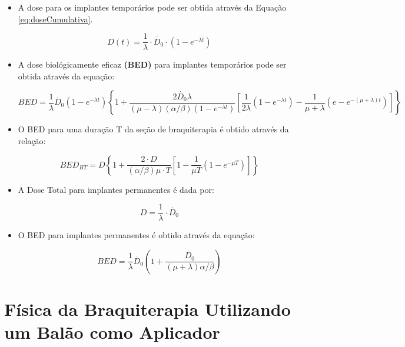 \documentclass[11pt,a4paper]{article}
\begin{document}
			\begin{itemize}
		
			
				\item A dose para os implantes temporários pode ser obtida através da Equação \ref{eq:doseCumulativa}. 

					$$D(t) = \frac{1}{\lambda} \cdot \dot{D_0} \cdot \left(1 - e^{-\lambda t}\right)$$

				\item A dose biológicamente eficaz \textbf{\textcolor{CarnationPink}{(BED)}} para implantes temporários pode ser obtida através da equação:

					\begin{equation}
						BED = \frac{1}{\lambda} \dot{D_0}\left(1 - e^{-\lambda t}\right)
						\left\{ 1 + \frac{2 \dot{D_0}\lambda}{(\mu - \lambda)(\alpha / \beta) (1 - e^{-\lambda t})}
						\left[\frac{1}{2\lambda}(1 - e^{-\lambda t }) - \frac{1}{\mu + \lambda} (e - e^{-(\mu + \lambda) t})\right]\right\} 
					\end{equation}

				\item O BED para uma duração T da seção de braquiterapia é obtido através da relação:

					\begin{equation}
						BED_{BT} = D \left\{ 1 + \frac{2 \cdot D}{(\alpha / \beta)\mu \cdot T}
						\left[1 - \frac{1}{\mu T} (1 - e^{-\mu T})\right]\right\}
					\end{equation}
				
				\item A Dose Total para implantes permanentes é dada por:
					
					\begin{equation}
						D = \frac{1}{\lambda} \cdot \dot{D_0}
					\end{equation}
				
				\item O BED para implantes permanentes é obtido através da equação:
					
					\begin{equation}
						BED = \frac{1}{\lambda} \dot{D_0} \left(1 + \frac{\dot{D_0}}{(\mu + \lambda) \alpha / \beta}\right)
					\end{equation}
			
			\end{itemize}


	\section{Física da Braquiterapia Utilizando um Balão como Aplicador}
\end{document}
